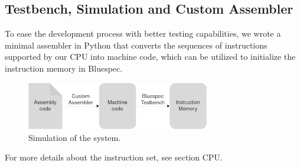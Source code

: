 \begin{paper}
\section*{Testbench, Simulation and Custom Assembler\sdot}

To ease the development process with better testing capabilities, we wrote a minimal assembler in Python that converts the sequences of instructions supported by our CPU into machine code, which can be utilized to initialize the instruction memory in Bluespec.\\
\begin{figure}[H]
\centering
\includegraphics[width=8cm]{Images/Overview-Simulation.png}
\caption{\content Simulation of the system.}
\end{figure}
\noindent For more details about the instruction set, see section CPU.
\end{paper}